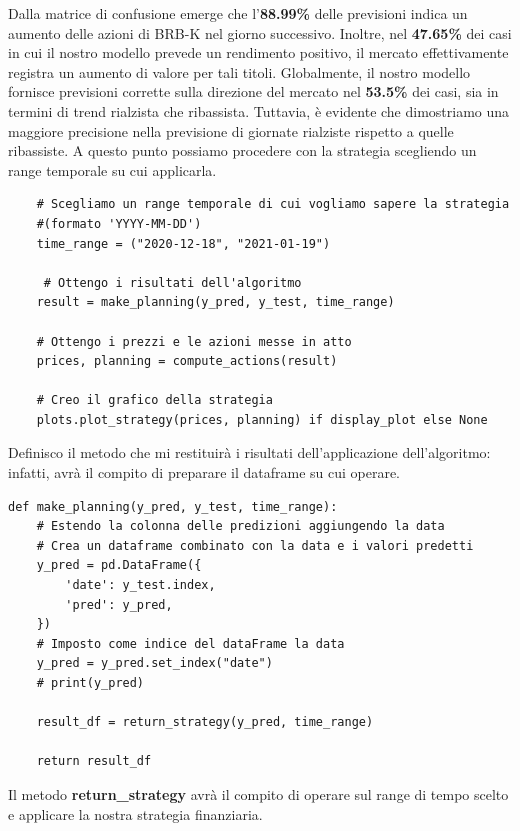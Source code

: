 \documentclass{article}
\begin{document}
Dalla matrice di confusione emerge che l'\textbf{88.99\%} delle previsioni indica un aumento delle azioni di BRB-K nel giorno successivo. Inoltre, nel \textbf{47.65\%} dei casi in cui il nostro modello prevede un rendimento positivo, il mercato effettivamente registra un aumento di valore per tali titoli.
Globalmente, il nostro modello fornisce previsioni corrette sulla direzione del mercato nel \textbf{53.5\%} dei casi, sia in termini di trend rialzista che ribassista. Tuttavia, è evidente che dimostriamo una maggiore precisione nella previsione di giornate rialziste rispetto a quelle ribassiste.
A questo punto possiamo procedere con la strategia scegliendo un range temporale su cui applicarla.
\begin{verbatim}
    # Scegliamo un range temporale di cui vogliamo sapere la strategia 
    #(formato 'YYYY-MM-DD')
    time_range = ("2020-12-18", "2021-01-19")

     # Ottengo i risultati dell'algoritmo
    result = make_planning(y_pred, y_test, time_range)

    # Ottengo i prezzi e le azioni messe in atto
    prices, planning = compute_actions(result)

    # Creo il grafico della strategia
    plots.plot_strategy(prices, planning) if display_plot else None
\end{verbatim}
Definisco il metodo che mi restituirà i risultati dell'applicazione dell'algoritmo: infatti, avrà il compito di preparare il dataframe su cui operare.
\begin{verbatim}
def make_planning(y_pred, y_test, time_range):
    # Estendo la colonna delle predizioni aggiungendo la data
    # Crea un dataframe combinato con la data e i valori predetti
    y_pred = pd.DataFrame({
        'date': y_test.index,
        'pred': y_pred,
    })
    # Imposto come indice del dataFrame la data
    y_pred = y_pred.set_index("date")
    # print(y_pred)

    result_df = return_strategy(y_pred, time_range)

    return result_df
\end{verbatim}
Il metodo \textbf{return\_strategy} avrà il compito di operare sul range di tempo scelto e applicare la nostra strategia finanziaria.
\end{document}
